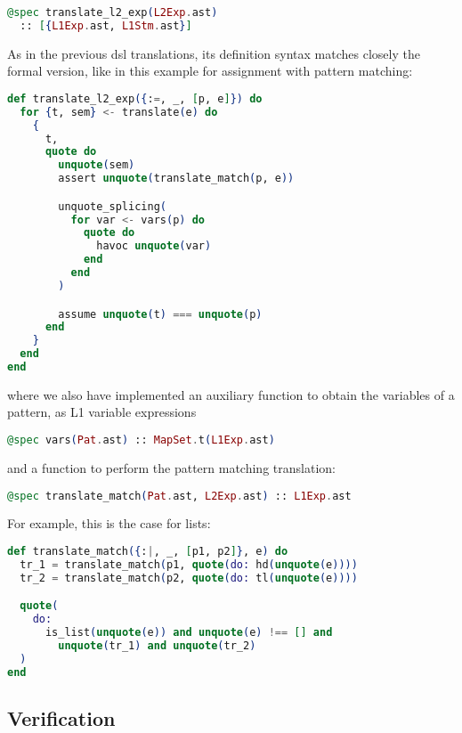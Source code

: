 \begin{lstlisting}[language=elixir,numbers=none,frame=none]
@spec translate_l2_exp(L2Exp.ast) 
  :: [{L1Exp.ast, L1Stm.ast}]
\end{lstlisting}

As in the previous \gls{dsl} translations, its definition syntax matches closely
the formal version, like in this example for assignment with pattern matching:

\begin{lstlisting}[language=elixir,numbers=none,frame=none]
def translate_l2_exp({:=, _, [p, e]}) do
  for {t, sem} <- translate(e) do
    {
      t,
      quote do
        unquote(sem)
        assert unquote(translate_match(p, e))

        unquote_splicing(
          for var <- vars(p) do
            quote do
              havoc unquote(var)
            end
          end
        )

        assume unquote(t) === unquote(p)
      end
    }
  end
end
\end{lstlisting}

where we also have implemented an auxiliary function to obtain the variables of
a pattern, as L1 variable expressions

\begin{lstlisting}[language=elixir,numbers=none,frame=none]
@spec vars(Pat.ast) :: MapSet.t(L1Exp.ast)
\end{lstlisting}

and a function to perform the pattern matching translation:

\begin{lstlisting}[language=elixir,numbers=none,frame=none]
@spec translate_match(Pat.ast, L2Exp.ast) :: L1Exp.ast
\end{lstlisting}

For example, this is the case for lists:

\begin{lstlisting}[language=elixir,numbers=none,frame=none]
def translate_match({:|, _, [p1, p2]}, e) do
  tr_1 = translate_match(p1, quote(do: hd(unquote(e))))
  tr_2 = translate_match(p2, quote(do: tl(unquote(e))))

  quote(
    do:
      is_list(unquote(e)) and unquote(e) !== [] and
        unquote(tr_1) and unquote(tr_2)
  )
end
\end{lstlisting}

\subsection{Verification}

